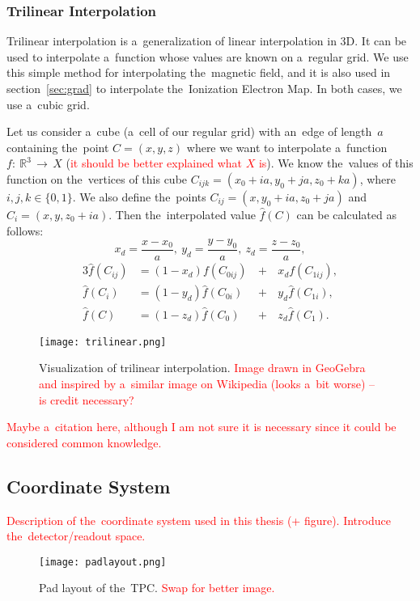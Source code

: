 			\subsubsection{Trilinear Interpolation}
				Trilinear interpolation is a~generalization of linear interpolation in 3D. It can be used to interpolate a~function whose values are known on a~regular grid. We use this simple method for interpolating the~magnetic field, and it is also used in section~\ref{sec:grad} to interpolate the~Ionization Electron Map. In both cases, we use a~cubic grid.
				
				Let us consider a~cube (a~cell of our regular grid) with an~edge of length~$a$ containing the~point $C = (x,y,z)$ where we want to interpolate a~function $f\!\!:~\!\!\mathbb{R}^3\,\to\,X$ (\textcolor{red}{it should be better explained what $X$ is}). We know the~values of this function on the~vertices of this cube $C_{ijk} = (x_0+ia,y_0+ja,z_0+ka)$, where $i,j,k \in \{0,1\}$. We also define the~points $C_{ij} = (x,y_0+ia,z_0+ja)$ and $C_i=(x,y,z_0+ia)$. Then the~interpolated value $\widehat{f}(C)$ can be calculated as follows:
				\begin{equation}
					x_d = \frac{x-x_0}{a},~y_d = \frac{y-y_0}{a},~z_d = \frac{z-z_0}{a},
				\end{equation}
				\begin{alignat}{3}
					\widehat{f}(C_{ij}) &= (1-x_d)f(C_{0ij}) \,&+&\,x_d f(C_{1ij}),\\
					\widehat{f}(C_{i}) &= (1-y_d)\widehat{f}(C_{0i}) &+&\,y_d \widehat{f}(C_{1i}),\\
					\widehat{f}(C) &= (1-z_d)\widehat{f}(C_0) &+&\,z_d \widehat{f}(C_1).
				\end{alignat}
				
				\begin{figure}
					\centering
					\texttt{[image: trilinear.png]}
					\label{fig:trilin}
					\caption{Visualization of trilinear interpolation. \textcolor{red}{Image drawn in GeoGebra and inspired by a~similar image on Wikipedia (looks a~bit worse) -- is credit necessary?}}
				\end{figure}
				
				\textcolor{red}{Maybe a~citation here, although I am not sure it is necessary since it could be considered common knowledge.}
		
		\subsection{Coordinate System}
		\label{sec:coor}
		\textcolor{red}{Description of the~coordinate system used in this thesis (+ figure). Introduce the~detector/readout space.}
	
	\begin{figure}
		\centering
		\texttt{[image: padlayout.png]}
		\caption{Pad layout of the~TPC. \textcolor{red}{Swap for better image.}}
		\label{fig:padlayout}
	\end{figure}